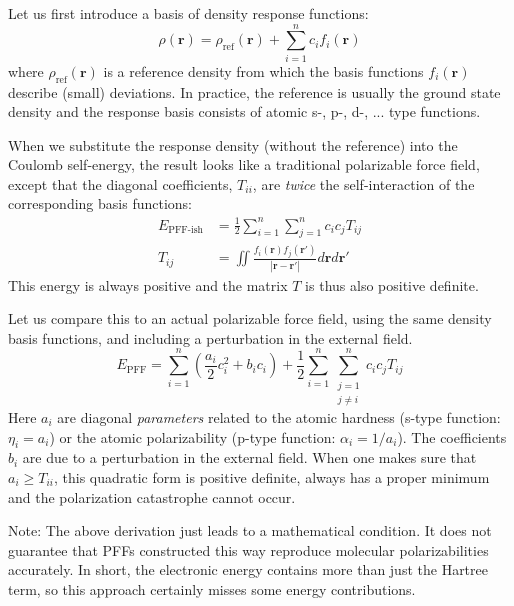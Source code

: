 \documentclass[a4paper,12pt,parskip=half]{scrartcl}
\begin{document}
Let us first introduce a basis of density response functions:
%
\begin{equation}
    \rho(\mathbold{r}) = \rho_\text{ref}(\mathbold{r}) + \sum_{i=1}^n c_i f_i(\mathbold{r})
\end{equation}
%
where $\rho_\text{ref}(\mathbold{r})$ is a reference density from which the basis functions $f_i(\mathbold{r})$ describe (small) deviations. In practice, the reference is usually the ground state density and the response basis consists of atomic s-, p-, d-, ... type functions.

When we substitute the response density (without the reference) into the Coulomb self-energy, the result looks like a traditional polarizable force field, except that the diagonal coefficients, $T_{ii}$, are \textit{twice} the self-interaction of the corresponding basis functions:
%
\begin{align}
    E_\text{PFF-ish} &= \frac{1}{2} \sum_{i=1}^n \sum_{j=1}^n c_i c_j T_{ij} \\
    \label{eq:pff_matrix}
    T_{ij} &= \iint \frac{ f_i(\mathbold{r}) f_j(\mathbold{r}') }{| \mathbold{r} - \mathbold{r}' |} d\mathbold{r} d\mathbold{r}'
\end{align}
%
This energy is always positive and the matrix $T$ is thus also positive definite.

Let us compare this to an actual polarizable force field, using the same density basis functions, and including a perturbation in the external field.
%
\begin{equation}
    E_\text{PFF} = \sum_{i=1}^n \left( \frac{a_i}{2} c_i^2 + b_i c_i \right) + \frac{1}{2} \sum_{i=1}^n \sum_{\substack{j=1 \\ j\ne i}}^n c_i c_j T_{ij}
\end{equation}
%
Here $a_i$ are diagonal \textit{parameters} related to the atomic hardness (s-type function: $\eta_i=a_i$) or the atomic polarizability (p-type function: $\alpha_i=1/a_i$). The coefficients $b_i$ are due to a perturbation in the external field. When one makes sure that $a_i \ge T_{ii}$, this quadratic form is positive definite, always has a proper minimum and the polarization catastrophe cannot occur.

Note: The above derivation just leads to a mathematical condition. It does not guarantee that PFFs constructed this way reproduce molecular polarizabilities accurately. In short, the electronic energy contains more than just the Hartree term, so this approach certainly misses some energy contributions.
\end{document}
